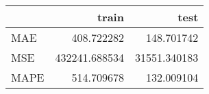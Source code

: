 \begin{tabular}{lrr}
\toprule
{} &          train &          test \\
\midrule
MAE  &     408.722282 &    148.701742 \\
MSE  &  432241.688534 &  31551.340183 \\
MAPE &     514.709678 &    132.009104 \\
\bottomrule
\end{tabular}
